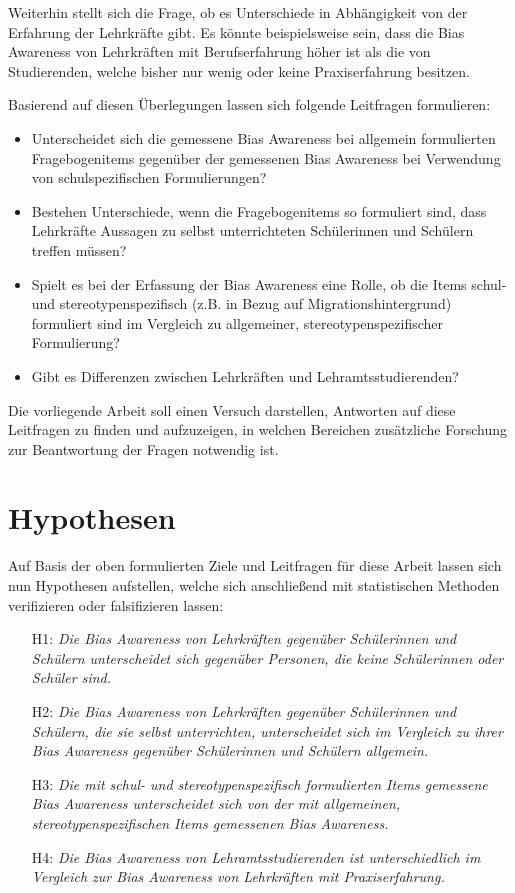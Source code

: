 Weiterhin stellt sich die Frage, ob es Unterschiede in Abhängigkeit von der Erfahrung der Lehrkräfte gibt.
Es könnte beispielsweise sein, dass die Bias Awareness von Lehrkräften mit Berufserfahrung höher ist als die von Studierenden, welche bisher nur wenig oder keine Praxiserfahrung besitzen.

Basierend auf diesen Überlegungen lassen sich folgende Leitfragen formulieren:

\begin{itemize}
	\item Unterscheidet sich die gemessene Bias Awareness bei allgemein formulierten Fragebogenitems gegenüber der gemessenen Bias Awareness bei Verwendung von schulspezifischen Formulierungen?
	\item Bestehen Unterschiede, wenn die Fragebogenitems so formuliert sind, dass Lehrkräfte Aussagen zu selbst unterrichteten Schülerinnen und Schülern treffen müssen?
	\item Spielt es bei der Erfassung der Bias Awareness eine Rolle, ob die Items schul- und stereotypenspezifisch (z.B. in Bezug auf Migrationshintergrund) formuliert sind im Vergleich zu allgemeiner, stereotypenspezifischer Formulierung?
	\item Gibt es Differenzen zwischen Lehrkräften und Lehramtsstudierenden?
\end{itemize}

Die vorliegende Arbeit soll einen Versuch darstellen, Antworten auf diese Leitfragen zu finden und aufzuzeigen, in welchen Bereichen zusätzliche Forschung zur Beantwortung der Fragen notwendig ist.


\section{Hypothesen}
\label{sec:hypothesen}

Auf Basis der oben formulierten Ziele und Leitfragen für diese Arbeit lassen sich nun Hypothesen aufstellen, welche sich anschließend mit statistischen Methoden verifizieren oder falsifizieren lassen:

\begin{enumerate}
	\item[H1:] \emph{Die Bias Awareness von Lehrkräften gegenüber Schülerinnen und Schülern unterscheidet sich gegenüber Personen, die keine Schülerinnen oder Schüler sind.}
	\item[H2:] \emph{Die Bias Awareness von Lehrkräften gegenüber Schülerinnen und Schülern, die sie selbst unterrichten, unterscheidet sich im Vergleich zu ihrer Bias Awareness gegenüber Schülerinnen und Schülern allgemein.}
	\item[H3:] \emph{Die mit schul- und stereotypenspezifisch formulierten Items gemessene Bias Awareness unterscheidet sich von der mit allgemeinen, stereotypenspezifischen Items gemessenen Bias Awareness.}
	\item[H4:] \emph{Die Bias Awareness von Lehramtsstudierenden ist unterschiedlich im Vergleich zur Bias Awareness von Lehrkräften mit Praxiserfahrung.}
\end{enumerate}

